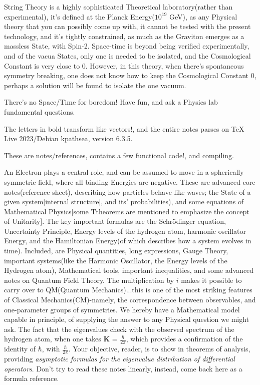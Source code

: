 \documentclass[a4paper, 10pt, onepage]{elegantbook}
\begin{document}
String Theory is a highly sophisticated Theoretical laboratory(rather than experimental),
it's defined at the Planck Energy($10^{19}$ GeV), as any Physical theory that you can possibly come up with,
it cannot be tested with the present technology, and it's tightly constrained, 
as much as the Graviton emerges as a massless State, with Spin-2.  
Space-time is beyond being verified experimentally, and of the vacua States, only one is needed to be isolated,
and the  Cosmological Constant is very close to 0. However, in this theory, when there's spontaneous symmetry breaking,
one does not know how to keep the Cosmological Constant 0, perhaps a solution will be found to isolate the one vacuum.

There's no Space/Time for boredom! Have fun, and ask a Physics lab fundamental questions.

The letters in bold transform like vectors!, and the entire notes parses on TeX Live 2023/Debian kpathsea, version 
6.3.5.

These are notes/references, contains a few functional code!, and compiling.


An Electron plays a central role, and can be assumed to move in a spherically symmetric field,
where all binding Energies are negative. These are advanced core notes(reference sheet), describing how particles 
behave like waves;
the State of a given system[internal structure], and its' probabilities),
and some equations of Mathematical Physics[some Ttheorems are mentioned to emphasize the concept of Unitarity].
The key important formulas are the Schr\"odinger equation,
Uncertainty Principle, Energy levels of the hydrogen atom, harmonic oscillator Energy,
and the Hamiltonian Energy(of which describes how a system evolves in time).
Included, are Physical quantities, long expressions, Gauge Theory,
important systems(like the Harmonic Oscillator, the Energy levels of the Hydrogen atom), Mathematical tools,
important inequalities, and some advanced notes on Quantum Field Theory. The multiplication by $i$ makes it possible
to carry over to QM(Quantum Mechanics)...this is one of the most striking features of Classical Mechanics(CM)-namely,
the correspondence between observables, and one-parameter groups of symmetries. We hereby have a Mathematical model
capable in principle, of supplying the answer to any Physical question we might ask. The fact that the eigenvalues 
check with
the observed spectrum of the hydrogen atom, when one takes $\mathbf K$ = $\frac{\hbar}{2 \pi}$, which provides a 
confirmation
of the identity of $\hbar$, with $\frac{\hbar}{2 \pi}$. Your objective, reader, is to show in theorems of analysis, 
providing
\emph{asymptotic formulas for the eigenvalue distribution of differential operators}.
Don't try to read these notes linearly, instead, come back here as a formula reference.
\end{document}
